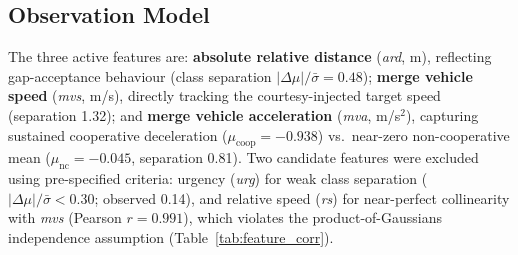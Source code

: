 \subsection{Observation Model}
\label{sec:obs_model}
The three active features are: \textbf{absolute relative distance}
(\emph{ard}, m), reflecting gap-acceptance behaviour (class separation
$|\Delta\mu|/\bar\sigma{=}0.48$); \textbf{merge vehicle speed}
(\emph{mvs}, m/s), directly tracking the courtesy-injected target speed
(separation 1.32); and \textbf{merge vehicle acceleration}
(\emph{mva}, m/s$^2$), capturing sustained cooperative deceleration
($\mu_\text{coop}{=}-0.938$) vs.\ near-zero non-cooperative mean
($\mu_\text{nc}{=}-0.045$, separation 0.81).
Two candidate features were excluded using pre-specified criteria: urgency
(\emph{urg}) for weak class separation ($|\Delta\mu|/\bar\sigma{<}0.30$;
observed 0.14), and relative speed (\emph{rs}) for near-perfect collinearity
with \emph{mvs} (Pearson $r{=}0.991$), which violates the product-of-Gaussians
independence assumption (Table~\ref{tab:feature_corr}).

